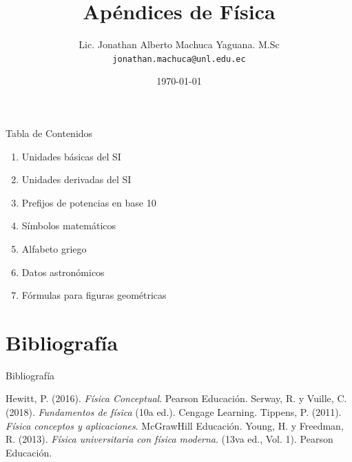 \documentclass[10pt]{beamer}
\begin{document}
\title{Apéndices de Física}

\author[M.Sc. Jonathan Machuca]{
Lic. Jonathan Alberto Machuca Yaguana. M.Sc\\
{\scriptsize \texttt{jonathan.machuca@unl.edu.ec}}}


\date{\today}


\begin{frame}[plain]
    \maketitle
\end{frame}


\begin{frame}{Tabla de Contenidos}
    \begin{enumerate}
        \item Unidades básicas del SI
        \item Unidades derivadas del SI
        \item Prefijos de potencias en base 10
        \item Símbolos matemáticos
        \item Alfabeto griego
        \item Datos astronómicos
        \item Fórmulas para figuras geométricas
    \end{enumerate}
\end{frame}





\section{Bibliografía}

\begin{frame}{Bibliografía}
    \begin{thebibliography}{8}
         Hewitt, P. (2016). \textit{Física Conceptual}. Pearson Educación.
         Serway, R. y Vuille, C. (2018). \textit{Fundamentos de física} (10a ed.). Cengage Learning.
         Tippens, P. (2011). \textit{Física conceptos y aplicaciones}. McGrawHill Educación.
          Young, H. y Freedman, R. (2013). \textit{Física universitaria con física moderna}. (13va ed., Vol. 1). Pearson Educación.
    \end{thebibliography}
\end{frame}
\end{document}
